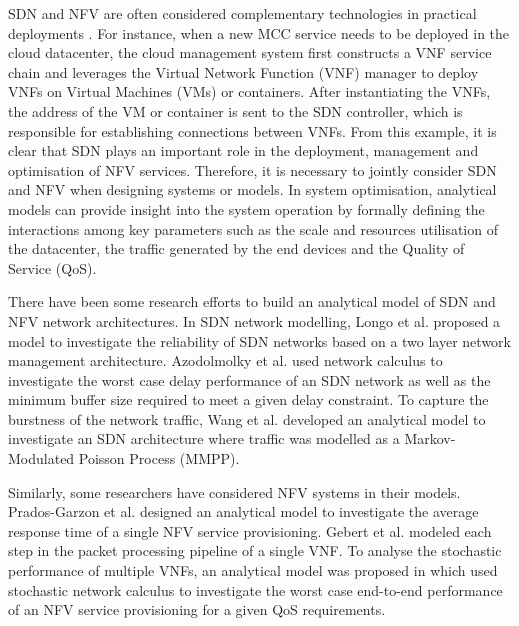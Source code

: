 SDN and NFV are often considered complementary technologies in practical deployments \cite{MatiasGTUJ15}. For instance, when a new MCC service needs to be deployed in the cloud datacenter, the cloud management system first constructs a VNF service chain and leverages the Virtual Network Function (VNF) manager to deploy VNFs on Virtual Machines (VMs) or containers. After instantiating the VNFs, the address of the VM or container is sent to the SDN controller, which is responsible for establishing connections between VNFs. From this example, it is clear that SDN plays an important role in the deployment, management and optimisation of NFV services. Therefore, it is necessary to jointly consider SDN and NFV when designing systems or models. In system optimisation, analytical models can provide insight into the system operation by formally defining the interactions among key parameters such as the scale and resources utilisation of the datacenter, the traffic generated by the end devices and the Quality of Service (QoS). 

There have been some research efforts to build an analytical model of SDN and NFV network architectures. In SDN network modelling, Longo et al. \cite{LongoDBS15} proposed a model to investigate the reliability of SDN networks based on a two layer network management architecture. Azodolmolky et al. \cite{AzodolmolkyWY13} used network calculus to investigate the worst case delay performance of an SDN network as well as the minimum buffer size required to meet a given delay constraint. To capture the burstness of the network traffic, Wang et al. \cite{MiaoMWWH16} developed an analytical model to investigate an SDN architecture where traffic was modelled as a Markov-Modulated Poisson Process (MMPP). 

Similarly, some researchers have considered NFV systems in their models. Prados-Garzon et al. \cite{Prados-GarzonAR17} designed an analytical model to investigate the average response time of a single NFV service provisioning. Gebert et al. \cite{GebertZLST16} modeled each step in the packet processing pipeline of a single VNF. To analyse the stochastic performance of multiple VNFs, an analytical model was proposed in \cite{MiaoMWHZWL19} which used stochastic network calculus to investigate the worst case end-to-end performance of an NFV service provisioning for a given QoS requirements. 

